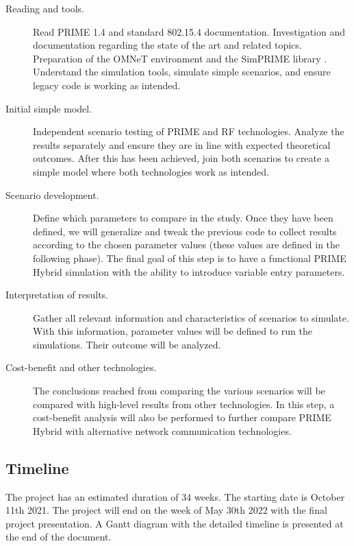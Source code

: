 \begin{description}
   \item[Reading and tools.] Read PRIME 1.4 and standard 802.15.4 documentation. Investigation and documentation regarding the state of the art and related topics. Preparation of the OMNeT environment \cite{omnet} and the SimPRIME library \cite{simprime}. Understand the simulation tools, simulate simple scenarios, and ensure legacy code is working as intended.
   \item[Initial simple model.] Independent scenario testing of PRIME and RF technologies. Analyze the results separately and ensure they are in line with expected theoretical outcomes. After this has been achieved, join both scenarios to create a simple model where both technologies work as intended.
   \item[Scenario development.] Define which parameters to compare in the study. Once they have been defined, we will generalize and tweak the previous code to collect results according to the chosen parameter values (these values are defined in the following phase). The final goal of this step is to have a functional PRIME Hybrid simulation with the ability to introduce variable entry parameters.
   \item[Interpretation of results.] Gather all relevant information and characteristics of scenarios to simulate. With this information, parameter values will be defined to run the simulations. Their outcome will be analyzed.
    \item[Cost-benefit and other technologies.] The conclusions reached from comparing the various scenarios will be compared with high-level results from other technologies. In this step, a cost-benefit analysis will also be performed to further compare PRIME Hybrid with alternative network communication technologies.
\end{description}



\subsection{Timeline}\label{cronograma}

The project has an estimated duration of 34 weeks. The starting date is October 11th 2021. The project will end on the week of May 30th 2022 with the final project presentation. A Gantt diagram with the detailed timeline is presented at the end of the document.

